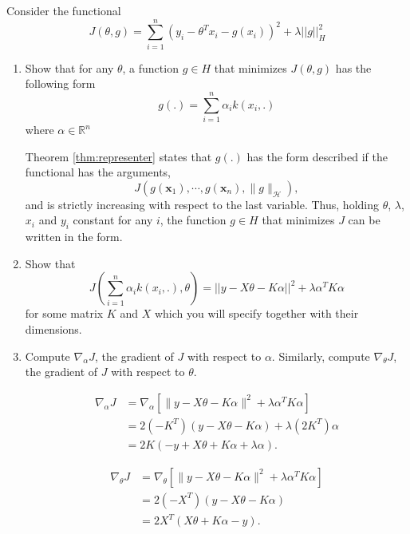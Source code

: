 \documentclass{article}[12pt]
\begin{document}
Consider the functional 
\begin{equation}
J(\theta,g) = \sum_{i=1}^n \left(y_i - \theta^T x_i - g(x_i)\right)^2 + \lambda ||g||_H^2
\end{equation}
\begin{enumerate}
\item 
Show that for any $\theta$, a function $g \in H$ that minimizes $J(\theta,g)$ has the following form 
\begin{equation}
g(.)=\sum_{i=1}^n \alpha_i k(x_i,.)
\end{equation}
where $\alpha \in \mathbb{R}^n$ 

Theorem \ref{thm:representer} states that $g(.)$ has the form described if the functional has the arguments,
\begin{equation}
 J\left(g\left(\mathbf{x}_{1}\right), \cdots, g\left(\mathbf{x}_{n}\right),\|g\|_{\mathcal{H}}\right),
\end{equation}
and is strictly increasing with respect to the last variable. Thus, holding $\theta$, $\lambda$, $x_i$ and $y_i$ constant for any $i$, the function $g \in H$ that minimizes $J$ can be written in the form.
 
\item 
Show that 
\begin{equation}
J(\sum_{i=1}^n \alpha_i k(x_i,.),\theta)=||y - X\theta - K\alpha||^2 + \lambda \alpha^T K \alpha
\end{equation}
for some matrix $K$ and $X$ which you will specify together with their dimensions. 
\item Compute $\nabla_\alpha J$, the gradient of $J$ with respect to $\alpha$. Similarly, compute $\nabla_\theta J$, the gradient of $J$ with respect to $\theta$. 

\begin{equation}
\begin{aligned}
\nabla_{\alpha} J &= \nabla_{\alpha} \left[ \|y-X \theta-K \alpha\|^{2}+\lambda \alpha^{T} K \alpha \right] \\
&= 2 \left( -K^T \right)  \left( y-X \theta-K \alpha \right) + \lambda \left( 2K^T \right) \alpha \\
&= 2K \left( -y + X \theta + K \alpha + \lambda \alpha \right).
\end{aligned}
\end{equation}

\begin{equation}
\begin{aligned}
\nabla_{\theta} J &= \nabla_{\theta} \left[ \|y-X \theta-K \alpha\|^{2}+\lambda \alpha^{T} K \alpha \right] \\
&= 2\left(-X^T \right) \left( y - X \theta - K \alpha\right) \\
&= 2X^T\left( X\theta + K\alpha -y\right).
\end{aligned}
\end{equation}


\end{enumerate}
\end{document}
